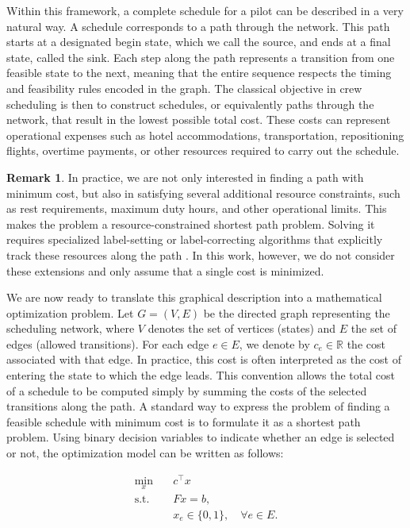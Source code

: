 \documentclass{book}
\theoremstyle{definition}
\newtheorem{remark}[theorem]{Remark}
\newcounter{algorithm_}
\numberwithin{algorithm_}{chapter}
\begin{document}
{\bigskip

Within this framework, a complete schedule for a pilot can be described in a very natural way. A schedule corresponds to a path through the network. This path starts at a designated begin state, which we call the source, and ends at a final state, called the sink. Each step along the path represents a transition from one feasible state to the next, meaning that the entire sequence respects the timing and feasibility rules encoded in the graph. The classical objective in crew scheduling is then to construct schedules, or equivalently paths through the network, that result in the lowest possible total cost. These costs can represent operational expenses such as hotel accommodations, transportation, repositioning flights, overtime payments, or other resources required to carry out the schedule.


\begin{remark} \label{rem:resources}
In practice, we are not only interested in finding a path with minimum cost, but also in satisfying several additional resource constraints, such as rest requirements, maximum duty hours, and other operational limits. This makes the problem a resource-constrained shortest path problem. Solving it requires specialized label-setting or label-correcting algorithms that explicitly track these resources along the path \cite{Irnich2005}. In this work, however, we do not consider these extensions and only assume that a single cost is minimized.
\end{remark}


\bigskip

We are now ready to translate this graphical description into a mathematical optimization problem. Let $G = (V, E)$ be the directed graph representing the scheduling network, where $V$ denotes the set of vertices (states) and $E$ the set of edges (allowed transitions). For each edge $e \in E$, we denote by $c_e \in \mathbb{R}$ the cost associated with that edge. In practice, this cost is often interpreted as the cost of entering the state to which the edge leads. This convention allows the total cost of a schedule to be computed simply by summing the costs of the selected transitions along the path.
A standard way to express the problem of finding a feasible schedule with minimum cost is to formulate it as a shortest path problem. Using binary decision variables to indicate whether an edge is selected or not, the optimization model can be written as follows:

\begin{subequations} \label{eq:pilot_shortest_path}
\begin{align}
\min_{x} \quad & c^\top x \\[4pt]
\text{s.t.} \quad & F x = b, \label{eq:flow_conservation} \\[4pt]
& x_e \in \{0,1\}, \quad \forall e \in E.
\end{align}
\end{subequations}

}
\end{document}
